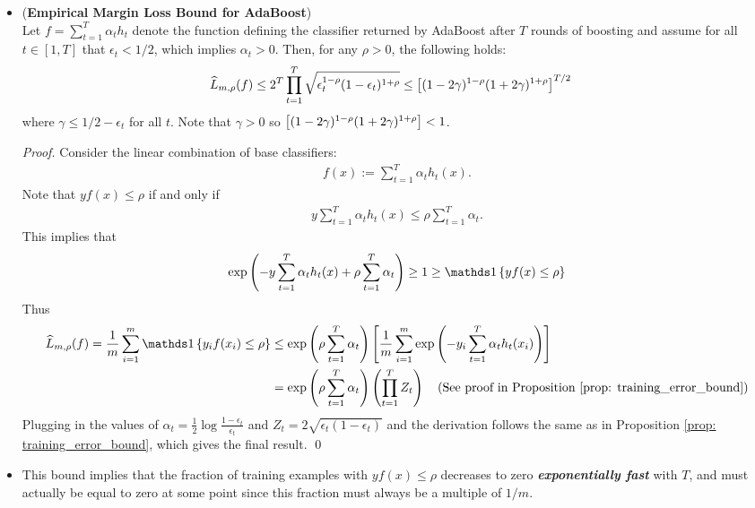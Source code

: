 \documentclass[11pt]{article}
\begin{document}
\begin{itemize}
\item \begin{proposition} (\textbf{Empirical Margin Loss Bound for AdaBoost})  \citep{schapire2012boosting, mohri2018foundations} \\
Let $f =\sum^T_{t=1}\alpha_t h_t$ denote the function defining the classifier returned by AdaBoost after $T$ rounds of boosting and assume for all $t \in [1, T]$ that $\epsilon_t < 1/2$, which implies $\alpha_t > 0$. Then, for any $\rho > 0$, the following holds:
\begin{align}
\widehat{L}_{m, \rho}(f)  &\le  2^T\prod_{t=1}^{T}\sqrt{\epsilon_t^{1-\rho}(1 - \epsilon_t)^{1 + \rho}} \le \left[(1- 2\gamma)^{1-\rho}(1+2\gamma)^{1+\rho}\right]^{T/2} \label{ineqn: emp_margin_loss_bound}
\end{align} where $ \gamma \le 1/2 - \epsilon_t$ for all $t$. Note that $\gamma > 0$ so $\left[(1- 2\gamma)^{1-\rho}(1+2\gamma)^{1+\rho}\right] < 1$.
\end{proposition}
\begin{proof}
Consider the linear combination of base classifiers:
\begin{align*}
f(x) := \sum_{t=1}^{T}\alpha_t h_t(x).
\end{align*} Note that $y f(x) \le \rho$ if and only if
\begin{align*}
y \sum_{t=1}^{T}\alpha_t h_t(x) \le \rho \sum_{t=1}^{T}\alpha_t.
\end{align*} This implies that 
\begin{align*}
\exp\paren{- y \sum_{t=1}^{T}\alpha_t h_t(x) + \rho \sum_{t=1}^{T}\alpha_t} \ge 1 \ge \ind{y f(x) \le \rho}
\end{align*} Thus
\begin{align*}
\widehat{L}_{m, \rho}(f) = \frac{1}{m}\sum_{i=1}^{m}\ind{y_i f(x_i) \le \rho} &\le \exp\paren{\rho \sum_{t=1}^{T}\alpha_t}\brac{\frac{1}{m}\sum_{i=1}^{m}\exp\paren{- y_i \sum_{t=1}^{T}\alpha_t h_t(x_i)}}\\
&= \exp\paren{\rho \sum_{t=1}^{T}\alpha_t} \paren{\prod_{t=1}^{T}Z_t}  \quad \text{(See proof in Proposition \ref{prop: training_error_bound})}
\end{align*} Plugging in the values of $\alpha_t = \frac{1}{2}\log\frac{1- \epsilon_t}{\epsilon_t}$ and $Z_t = 2\sqrt{\epsilon_t(1-\epsilon_t)}$ and the derivation follows the same as in Proposition \ref{prop: training_error_bound}, which gives the final result. \qed
\end{proof} 

\item \begin{remark}
This bound implies that the fraction of training examples with $yf(x) \le \rho$ decreases to zero \emph{\textbf{exponentially fast}} with $T$, and must actually be equal to zero at some point since this fraction must always be a multiple of $1/m$.
\end{remark}


\end{itemize}
\end{document}
